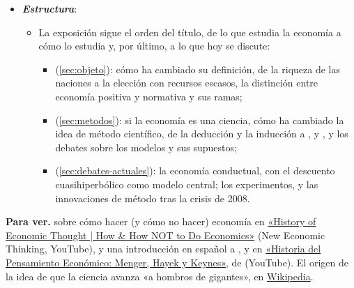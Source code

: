 \documentclass[11pt]{article}
\begin{document}
\begin{itemize}
\item \textbf{\emph{Estructura}}:
  \begin{itemize}
  \item La exposición sigue el orden del título, de lo que estudia la economía a cómo lo estudia y, por último, a lo que hoy se discute:
  \begin{itemize}
  \item {} (\ref{sec:objeto}): cómo ha cambiado su definición, de la riqueza de las naciones a la elección con recursos escasos, la distinción entre economía positiva y normativa y sus ramas;
  \item {} (\ref{sec:metodos}): si la economía es una ciencia, cómo ha cambiado la idea de método científico, de la deducción y la inducción a ,  y , y los debates sobre los modelos y sus supuestos;
  \item {} (\ref{sec:debates-actuales}): la economía conductual, con el descuento cuasihiperbólico como modelo central; los experimentos, y las innovaciones de método tras la crisis de 2008.
  \end{itemize}
  \end{itemize}
\end{itemize}

\begin{anotaciones}
\textbf{Para ver.}  sobre cómo hacer (y cómo no hacer) economía en \href{https://youtu.be/x4Y4DvpUIlo?t=1637}{«History of Economic Thought | How \& How NOT to Do Economics»} (New Economic Thinking, YouTube), y una introducción en español a ,  y  en \href{https://www.youtube.com/watch?v=jFfyQzypV5Q}{«Historia del Pensamiento Económico: Menger, Hayek y Keynes»}, de  (YouTube). El origen de la idea de que la ciencia avanza «a hombros de gigantes», en \href{https://es.wikipedia.org/wiki/Pararse_sobre_hombros_de_gigantes}{Wikipedia}.
\end{anotaciones}
\end{document}
